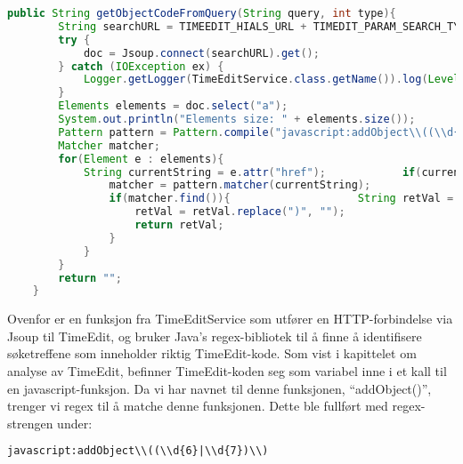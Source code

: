 \documentclass[../main.tex]{subfiles}
\begin{document}
\begin{lstlisting}[language=Java, frame=single, caption={asdasdsadasdasdasdsadsadasdasdsadsa}]
public String getObjectCodeFromQuery(String query, int type){
        String searchURL = TIMEEDIT_HIALS_URL + TIMEDIT_PARAM_SEARCH_TYPE + "=" + type + "&" + TIMEDIT_PARAM_SEARCH + "=" + query;        Document doc = null;
        try {
            doc = Jsoup.connect(searchURL).get();
        } catch (IOException ex) {
            Logger.getLogger(TimeEditService.class.getName()).log(Level.SEVERE, null, ex);
        }
        Elements elements = doc.select("a");
        System.out.println("Elements size: " + elements.size());
        Pattern pattern = Pattern.compile("javascript:addObject\\((\\d{6}|\\d{7})\\)");
        Matcher matcher;
        for(Element e : elements){
            String currentString = e.attr("href");            if(currentString != null && !currentString.isEmpty()){
                matcher = pattern.matcher(currentString);
                if(matcher.find()){                    String retVal = matcher.group().replace("javascript:addObject(", "");
                    retVal = retVal.replace(")", "");
                    return retVal;
                }
            }
        }
        return "";
    }
\end{lstlisting}

Ovenfor er en funksjon fra TimeEditService som utfører en HTTP-forbindelse via Jsoup til TimeEdit, og bruker Java’s regex-bibliotek til å finne å identifisere søketreffene som inneholder riktig TimeEdit-kode. Som vist i kapittelet om analyse av TimeEdit, befinner TimeEdit-koden seg som variabel inne i et kall til en javascript-funksjon. Da vi har navnet til denne funksjonen, “addObject()”, trenger vi regex til å matche denne funksjonen. Dette ble fullført med regex-strengen under:

\begin{lstlisting}[language=HTML, frame=single, caption={asdasdsadasdasdasdsadsadasdasdsadsa}]
javascript:addObject\\((\\d{6}|\\d{7})\\)
\end{lstlisting}
\end{document}
